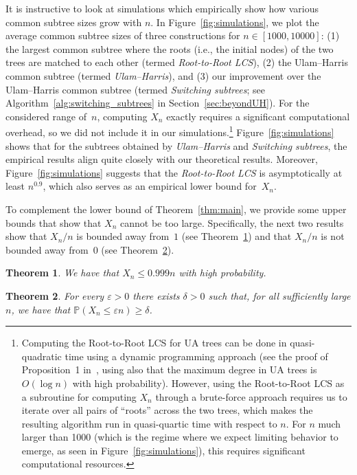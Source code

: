 \documentclass[11pt]{article}
\numberwithin{equation}{section}
\newcommand{\p}{\mathbb{P}} %
\newcommand{\eps}{\varepsilon} %
\newtheorem{theorem}{Theorem}[section]
\theoremstyle{definition}
\begin{document}
It is instructive to look at simulations which empirically show how various common subtree sizes grow with $n$. In Figure~\ref{fig:simulations}, we plot the average common subtree sizes of three constructions for $n \in [1000, 10000]$: (1) the largest common subtree where the roots (i.e., the initial nodes) of the two trees are matched to each other (termed \emph{Root-to-Root LCS}), (2) the 
Ulam--Harris 
common subtree 
(termed \emph{Ulam--Harris}), and (3) our improvement over the Ulam--Harris 
common subtree
(termed \emph{Switching subtrees}; see Algorithm~\ref{alg:switching_subtrees} in Section~\ref{sec:beyondUH}). For the considered range of~$n$, computing $X_n$ exactly requires a significant computational overhead, so we did not include it in our simulations.\footnote{Computing the Root-to-Root LCS for UA trees can be done in quasi-quadratic time using a dynamic programming approach (see the proof of Proposition~1 in~\cite{droschinsky2016faster}, using also that the maximum degree in UA trees is $O(\log n)$ with high probability). However, using the Root-to-Root LCS as a subroutine for computing $X_n$ through a brute-force approach requires us to iterate over all pairs of ``roots'' across the two trees, which makes the resulting algorithm run in quasi-quartic time with respect to $n$. For $n$ much larger than 1000 (which is the regime where we expect limiting behavior to emerge, as seen in Figure~\ref{fig:simulations}), this requires significant computational resources.} Figure~\ref{fig:simulations} shows that for the subtrees obtained by \emph{Ulam--Harris} and \emph{Switching subtrees}, the empirical results align quite closely with our theoretical results. Moreover, Figure~\ref{fig:simulations} suggests that the \emph{Root-to-Root LCS} is asymptotically at least $n^{0.9}$, which also serves as an empirical lower bound for~$X_n$. 



To complement the lower bound of Theorem~\ref{thm:main}, 
we provide some upper bounds that show that $X_{n}$ cannot be too large. 
Specifically, the next two results show that $X_{n}/n$ is bounded away from~$1$ (see Theorem~\ref{thm:UB_near1}) and that $X_{n}/n$ is not bounded away from~$0$ (see Theorem~\ref{thm:UB_near0}). 

\begin{theorem}\label{thm:UB_near1}
We have that $X_{n} \leq 0.999 n$ with high probability. 
\end{theorem}

\begin{theorem}\label{thm:UB_near0}
For every $\eps > 0$ there exists $\delta > 0$ such that, for all sufficiently large $n$, we have that $\p \left( X_{n} \leq \eps n \right) \geq \delta$. 
\end{theorem}
\end{document}
